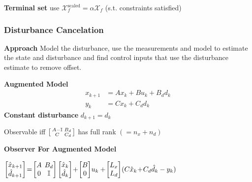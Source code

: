 \textbf{Terminal set} use
$\mathcal{X}_f^{\text{scaled}} = \alpha \mathcal{X}_f$
(s.t. constraints satisfied)


\subsubsection{Disturbance Cancelation}


\textbf{Approach}
Model the disturbance,
use the measurements and model
to estimate the state and disturbance
and find control inputs that use
the disturbance estimate to remove offset.

\textbf{Augmented Model}
\begin{align*}
	x_{k+1} & = Ax_k + Bu_k + B_d d_k \\
	y_k     & = Cx_k + C_d d_k
\end{align*}
\textbf{Constant disturbance}
$d_{k+1}  = d_k$

Observable iff
$\begin{bsmallmatrix}
		A - \mathbb{I} & B_d \\ C & C_d
	\end{bsmallmatrix}$
has full rank $(=n_x + n_d)$

\textbf{Observer For Augmented Model}

$
	\begin{bmatrix}
		\hat{x}_{k+1} \\
		\hat{d}_{k+1}
	\end{bmatrix}
	\!=\!
	\begin{bmatrix}
		A & \hspace{-2mm} B_d       \\
		0 & \hspace{-2mm}\mathbb{I}
	\end{bmatrix}
	\begin{bmatrix}
		\hat{x}_{k} \\
		\hat{d}_{k}
	\end{bmatrix}
	\!+\!
	\begin{bmatrix}
		B \\
		0
	\end{bmatrix}
	\!u_{k}
	+
	\hspace{-.5mm}
	\begin{bmatrix}
		L_x \\
		L_d
	\end{bmatrix}
	\hspace{-.5mm}
	(C\hat{x}_{k} \!+\! C_d \hat{d}_{k}-y_{k})
$


